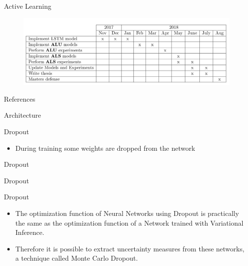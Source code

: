 \documentclass[10pt]{beamer}
\begin{document}
\begin{frame}[fragile]{Active Learning}
    \begin{figure}[htp]
        \centering
        \includegraphics[scale=0.22]{images/roadmap.png}
    \end{figure}
\end{frame}

\begin{frame}[allowframebreaks]{References}
  
  
\end{frame}

\begin{frame}[fragile]{Architecture}
    
\end{frame}

\begin{frame}[fragile]{Dropout}
\begin{itemize}
\item During training some weights are dropped from the network
\end{itemize}
\end{frame}

\begin{frame}[fragile]{Dropout}
    
\end{frame}

\begin{frame}[fragile]{Dropout}
    
\end{frame}

\begin{frame}[fragile]{Dropout}
\begin{itemize}
    \item The optimization function of Neural Networks using \alert{Dropout} is practically the same
        as the optimization function of a Network trained with Variational
        Inference.
    \vspace{0.5cm}
    \item Therefore it is possible to extract uncertainty measures from these
        networks, a technique called \alert{Monte Carlo Dropout}.
\end{itemize}
\end{frame}
\end{document}

